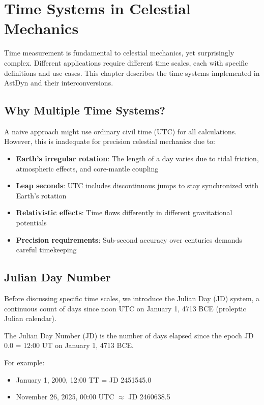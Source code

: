 \chapter{Time Systems in Celestial Mechanics}
\label{ch:time_systems}

Time measurement is fundamental to celestial mechanics, yet surprisingly complex. Different applications require different time scales, each with specific definitions and use cases. This chapter describes the time systems implemented in AstDyn and their interconversions.

\section{Why Multiple Time Systems?}

A naive approach might use ordinary civil time (UTC) for all calculations. However, this is inadequate for precision celestial mechanics due to:

\begin{itemize}
    \item \textbf{Earth's irregular rotation}: The length of a day varies due to tidal friction, atmospheric effects, and core-mantle coupling
    \item \textbf{Leap seconds}: UTC includes discontinuous jumps to stay synchronized with Earth's rotation
    \item \textbf{Relativistic effects}: Time flows differently in different gravitational potentials
    \item \textbf{Precision requirements}: Sub-second accuracy over centuries demands careful timekeeping
\end{itemize}

\section{Julian Day Number}

Before discussing specific time scales, we introduce the Julian Day (JD) system, a continuous count of days since noon UTC on January 1, 4713 BCE (proleptic Julian calendar).

\begin{definition}
The Julian Day Number (JD) is the number of days elapsed since the epoch JD 0.0 = 12:00 UT on January 1, 4713 BCE.
\end{definition}

For example:
\begin{itemize}
    \item January 1, 2000, 12:00 TT = JD 2451545.0
    \item November 26, 2025, 00:00 UTC $\approx$ JD 2460638.5
\end{itemize}

